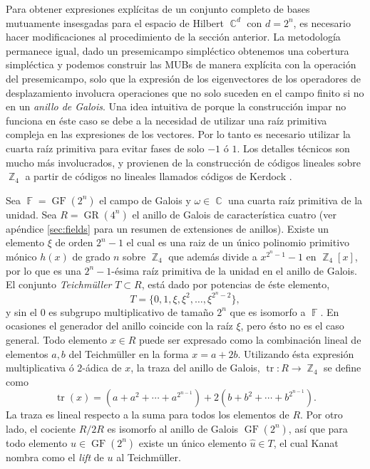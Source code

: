 \documentclass[a4paper,11pt]{report}
\DeclareMathOperator{\C}{\mathbb{C}}
\DeclareMathOperator{\Z}{\mathbb{Z}}
\DeclareMathOperator{\F}{\mathbb{F}}
\DeclareMathOperator{\tr}{tr}
\DeclareMathOperator{\GF}{GF}
\DeclareMathOperator{\GR}{GR}
\begin{document}
  Para obtener expresiones explícitas de un conjunto
  completo de bases mutuamente insesgadas para el espacio de
  Hilbert $\C^{d}$ con $d = 2^{n}$, es necesario hacer
  modificaciones al procedimiento de la sección anterior. La
  metodología permanece igual, dado un presemicampo
  simpléctico obtenemos una cobertura simpléctica y podemos
  construir las MUBs de manera explícita con la operación
  del presemicampo, solo que la expresión de los
  eigenvectores de los operadores de desplazamiento
  involucra operaciones que no solo suceden en el campo
  finito si no en un \textit{anillo de Galois}.  Una idea
  intuitiva de porque la construcción impar no funciona en
  éste caso se debe a la necesidad de utilizar una raíz
  primitiva compleja en las expresiones de los vectores. Por
  lo tanto es necesario utilizar la cuarta raíz primitiva
  para evitar fases de solo $-1$ ó $1$. Los detalles
  técnicos son mucho más involucrados, y provienen de la
  construcción de códigos lineales sobre $\Z_4$ a partir de
  códigos no lineales llamados códigos de Kerdock
  \cite{kantor1982}.

  Sea $\F = \GF(2^{n})$ el campo de Galois y $\omega \in \C$
  una cuarta raíz primitiva de la unidad. Sea $R =
  \GR(4^{n})$ el anillo de Galois de característica cuatro
  (ver apéndice \ref{sec:fields} para un resumen de
  extensiones de anillos). Existe un elemento $\xi$ de orden
  $2^{n}-1$ el cual es una raiz de un único polinomio
  primitivo mónico $h(x)$ de grado $n$ sobre $\Z_4$ que
  además divide a $x^{2^{n}-1} - 1$ en $\Z_4[x]$, por lo que
  es una $2^{n}-1$-ésima raíz primitiva de la unidad en el
  anillo de Galois. El conjunto \textit{Teichmüller} $T
  \subset R$, está dado por potencias de éste elemento,
  \begin{equation}
    T = \{0,1,\xi,\xi^2,\ldots,\xi^{2^{n}-2}\},
  \end{equation}
  y sin el $0$ es subgrupo multiplicativo de tamaño $2^{n}$
  que es isomorfo a $\F$. En ocasiones el generador del
  anillo coincide con la raíz $\xi$, pero ésto no es el caso
  general. Todo elemento $x \in R$ puede ser expresado como
  la combinación lineal de elementos $a,b$ del Teichmüller
  en la forma $x = a + 2b$.  Utilizando ésta expresión
  multiplicativa ó $2$-ádica de $x$, la traza del anillo de
  Galois, $\tr : R \to \Z_4$ se define como
  \begin{equation}
    \tr(x)
    = \left(a + a^2 + \cdots + a^{2^{n-1}}\right) + 2\left(
    b + b^2 + \cdots + b^{2^{n-1}}\right).
  \end{equation}
  La traza es lineal respecto a la suma para todos los
  elementos de $R$. Por otro lado, el cociente $R / 2R$ es
  isomorfo al anillo de Galois $\GF(2^{n})$, así que para
  todo elemento $u \in \GF(2^{n})$ existe un único elemento
  $\hat u \in T$, el cual Kanat nombra como el \textit{lift}
  de $u$ al Teichmüller. 
\end{document}
